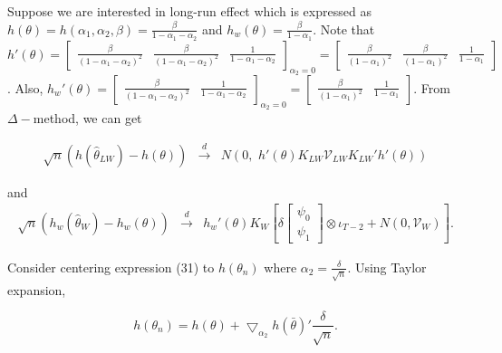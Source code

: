 \begin{cor}

\end{cor}


	Suppose we are interested in long-run effect which is expressed as $h(\theta) = h(\alpha_1, \alpha_2, \beta) = \frac{\beta}{1-\alpha_1-\alpha_2}$ and $h_w(\theta) = \frac{\beta}{1-\alpha_1}$. Note that $h'(\theta) = \left[\begin{array}{ccc} \frac{\beta}{(1-\alpha_1-\alpha_2)^2}& \frac{\beta}{(1-\alpha_1-\alpha_2)^2} & \frac{1}{1-\alpha_1-\alpha_2}\end{array}\right]_{\alpha_2=0} =\left[\begin{array}{ccc} \frac{\beta}{(1-\alpha_1)^2}& \frac{\beta}{(1-\alpha_1)^2} & \frac{1}{1-\alpha_1}\end{array}\right] $. Also, $h_w'(\theta) = \left[\begin{array}{ccc} \frac{\beta}{(1-\alpha_1-\alpha_2)^2}& \frac{1}{1-\alpha_1-\alpha_2}\end{array}\right]_{\alpha_2=0} =\left[\begin{array}{ccc} \frac{\beta}{(1-\alpha_1)^2}& \frac{1}{1-\alpha_1}\end{array}\right] $. From $\Delta-$method, we can get
	
	\begin{eqnarray}
 			\sqrt{n} (h(\widehat{\theta}_{LW})-h(\theta)) &\overset{d}{\rightarrow}&  			N\left(0,\,\, h'(\theta)K_{LW}\mathcal{V}_{LW}K_{LW}'h'(\theta) \right)
	\end{eqnarray}
	
	
and
\begin{eqnarray}
 	\sqrt{n}(h_w(\widehat{\theta}_{W})-h_w(\theta)) &\overset{d}{\rightarrow}&
 h_w'(\theta)	K_W  \left[\delta \left[\begin{array}{l} \psi_0\\ 
\psi_1 \end{array}\right]  \otimes \iota_{T-2} + N\left(0, \mathcal{V}_W\right) \right].
	\end{eqnarray}

	
	Consider centering expression (31) to $h(\theta_n)$ where $\alpha_2 = \frac{\delta}{\sqrt{n}}$. Using Taylor expansion,
	
	\[
h(\theta_n) = h(\theta) + \bigtriangledown_{\alpha_2} h(\bar{\theta})'\frac{\delta}{\sqrt{n}}.		
	\]	
	
